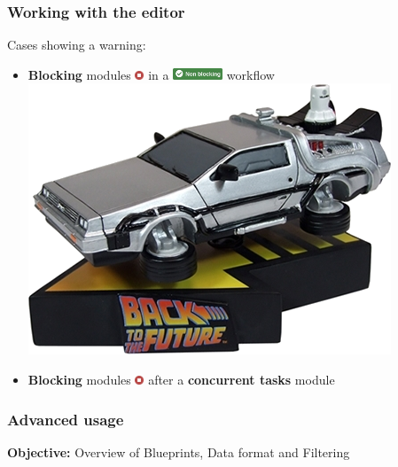 \begin{frame}
    \frametitle{Working with the editor}
    Cases showing a warning:
    \begin{itemize}
        \item \textbf{Blocking} modules \includegraphics[width=10px]{pictures/blocking-module.png} in a \includegraphics[valign=b,width=56px]{pictures/non-blocking-workflow.png} workflow \includegraphics[width=0.12\linewidth]{pictures/time-machine.png}
        \item \textbf{Blocking} modules \includegraphics[width=10px]{pictures/blocking-module.png} after a \textbf{concurrent tasks} module
        \begin{center}
        \end{center}
    \end{itemize}
\end{frame}

\begin{frame}
    \frametitle{
        \huge
        Advanced usage
        \vspace{1em}
    }
    \textbf{Objective:} Overview of Blueprints, Data format and Filtering
\end{frame}

